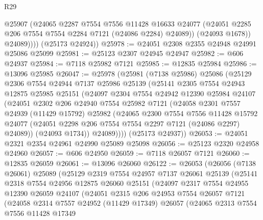 \begin{lexlean}{R29}
\begin{coremodule}
                @25907
                (@24065
                  @2287
                  @7554
                  @7556
                  @11428
                  @16633
                  @24077
                  (@24051 @2285 @206 @7554 @7554 @2284 @7121 (@24086 @2284) @24089))
                (@24093 @1678))
              @24089))))
      (@25173 @24924))
@25978 := @24051 @2308 @2355 @24948 @24991 @25086 @25099
@25981 := @25123 @2307 @24945 @24947
@25982 := @606 @24937
@25984 := @7118 @25982 @7121
@25985 := @12835 @25984
@25986 := @13096 @25985
@26047 := @25978
    (@25981
      (@7138 @25986)
      @25086
      (@25129
        @2306
        @7554
        @24944
        @7137
        @25986
        @25139
        (@25141
          @2305
          @7554
          @24943
          @12875
          @25985
          @25151
          (@24097
            @2304
            @7554
            @24942
            @12390
            @25984
            @24107
            (@24051
              @2302
              @206
              @24940
              @7554
              @25982
              @7121
              (@24058
                @2301
                @7557
                @24939
                (@11429 @15792)
                @25982
                (@24065
                  @2300
                  @7554
                  @7556
                  @11428
                  @15792
                  @24077
                  (@24051 @2298 @206 @7554 @7554 @2297 @7121 (@24086 @2297) @24089))
                (@24093 @1734))
              @24089))))
      (@25173 @24937))
@26053 := @24051 @2321 @2354 @24961 @24990 @25089 @25098
@26056 := @25123 @2320 @24958 @24960
@26057 := @606 @24950
@26059 := @7118 @26057 @7121
@26060 := @12835 @26059
@26061 := @13096 @26060
@26122 := @26053
    (@26056
      (@7138 @26061)
      @25089
      (@25129
        @2319
        @7554
        @24957
        @7137
        @26061
        @25139
        (@25141
          @2318
          @7554
          @24956
          @12875
          @26060
          @25151
          (@24097
            @2317
            @7554
            @24955
            @12390
            @26059
            @24107
            (@24051
              @2315
              @206
              @24953
              @7554
              @26057
              @7121
              (@24058
                @2314
                @7557
                @24952
                (@11429 @17349)
                @26057
                (@24065
                  @2313
                  @7554
                  @7556
                  @11428
                  @17349

\end{coremodule}
\end{lexlean}
